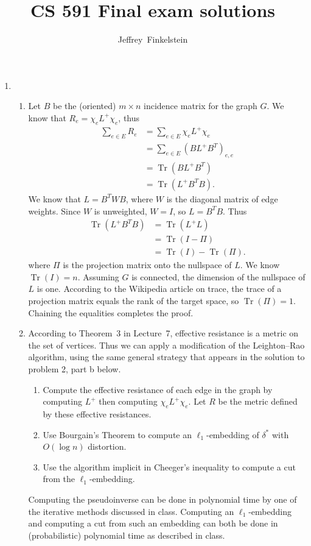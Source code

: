 \documentclass{article}
\author{Jeffrey~Finkelstein}
\title{CS 591 Final exam solutions}
\newcommand{\0}{\mathbf{0}}
\DeclareMathOperator{\Tr}{Tr}
\begin{document}
\maketitle


\begin{enumerate}
\item
  \begin{enumerate}
  \item
    Let $B$ be the (oriented) $m \times n$ incidence matrix for the graph $G$.
    We know that $R_e = \chi_e L^+ \chi_e$, thus
    \begin{align*}
      \sum_{e \in E} R_e & = \sum_{e \in E} \chi_e L^+ \chi_e \\
      & = \sum_{e \in E} (B L^+ B^T)_{e, e} \\
      & = \Tr(B L^+ B^T) \\
      & = \Tr(L^+ B^T B).
    \end{align*}
    We know that $L = B^T W B$, where $W$ is the diagonal matrix of edge weights.
    Since $W$ is unweighted, $W = I$, so $L = B^T B$.
    Thus
    \begin{align*}
      \Tr(L^+ B^T B) & = \Tr(L^+ L) \\
      & = \Tr(I - \Pi) \\
      & = \Tr(I) - \Tr(\Pi).
    \end{align*}
    where $\Pi$ is the projection matrix onto the nullspace of $L$.
    We know $\Tr(I) = n$.
    Assuming $G$ is connected, the dimension of the nullspace of $L$ is one.
    According to the Wikipedia article on trace, the trace of a projection matrix equals the rank of the target space, so $\Tr(\Pi) = 1$.
    Chaining the equalities completes the proof.
  \item
    According to Theorem~3 in Lecture~7, effective resistance is a metric on the set of vertices.
    Thus we can apply a modification of the Leighton--Rao algorithm, using the same general strategy that appears in the solution to problem 2, part b below.
    \begin{enumerate}
    \item
      Compute the effective resistance of each edge in the graph by computing $L^+$ then computing $\chi_e L^+ \chi_e$.
      Let $R$ be the metric defined by these effective resistances.
    \item Use Bourgain's Theorem to compute an $\ell_1$-embedding of $\delta^*$ with $O(\log n)$ distortion.
    \item Use the algorithm implicit in Cheeger's inequality to compute a cut from the $\ell_1$-embedding.
    \end{enumerate}
    Computing the pseudoinverse can be done in polynomial time by one of the iterative methods discussed in class.
    Computing an $\ell_1$-embedding and computing a cut from such an embedding can both be done in (probabilistic) polynomial time as described in class.


\end{enumerate}
\end{enumerate}
\end{document}
